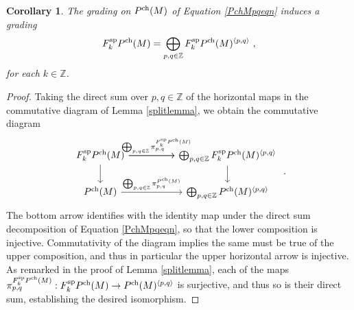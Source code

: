 \documentclass[11pt]{amsart}
\numberwithin{equation}{section}
\newtheorem{coro}[theo]{Corollary}
\theoremstyle{definition}
\newcommand{\bb}{\mathbb}
\newcommand{\spe}{{\textup{sp}}}
\newcommand{\ch}{{\textup{ch}}}
\newcommand{\0}{{\textbf{0}}}
\newcommand{\Z}{\bb Z}
\def\ch{{\rm ch}}
\begin{document}
\begin{coro}\label{Fspedseqn} 
The grading on $P^\ch(M)$ of Equation \ref{PchMpqeqn} induces a grading
	\[ 
	F_k^\spe P^\ch(M) = \bigoplus_{p,q \in \Z} F_k^\spe P^\ch(M)^{\langle p,q\rangle}   \ ,
	\]
	for each $k\in \Z$.
\end{coro}
\begin{proof}
	Taking the direct sum over $p,q\in \Z$ of the horizontal maps in the commutative diagram of Lemma \ref{splitlemma}, we obtain the commutative diagram
		\[ 
		\begin{tikzcd}[column sep=huge] 
		F_k^\spe P^\ch(M) \arrow[r,"\bigoplus_{p,q \in \Z} \pi_{p,q}^{F_k^\spe P^\ch(M) }"{xshift=5pt}]\arrow[d] \arrow[r] &\bigoplus_{p,q \in \Z}  F_k^\spe P^\ch(M)^{\langle p,q \rangle }\arrow[d]  \\
		P^\ch(M) \arrow[r,"\bigoplus_{p,q \in \Z} \pi_{p,q}^{P^\ch(M)}"]  & \bigoplus_{p,q \in \Z}  P^\ch(M)^{\langle p,q \rangle } 
	\end{tikzcd} \ . 
	\]
	The bottom arrow identifies with the identity map under the direct sum decomposition of Equation \ref{PchMpqeqn}, so that the lower composition is injective. Commutativity of the diagram implies the same must be true of the upper composition, and thus in particular the upper horizontal arrow is injective. As remarked in the proof of Lemma \ref{splitlemma}, each of the maps $\pi_{p,q}^{F_k^\spe P^\ch(M)}:F_k^\spe P^\ch(M) \to P^\ch(M)^{\langle p,q \rangle}$ is surjective, and thus so is their direct sum, establishing the desired isomorphism.
\end{proof}
\end{document}
